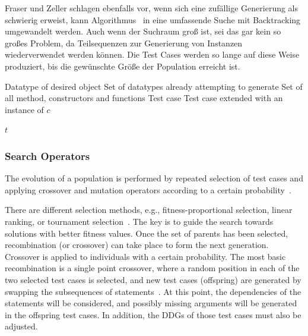 \documentclass{article}
\newcommand{\Desc}[2]{\State \makebox[2em][l]{#1}#2}
\begin{document}
Fraser und Zeller schlagen ebenfalls vor, wenn sich eine zufällige Generierung als schwierig erweist, kann Algorithmus~ in eine umfassende Suche mit Backtracking umgewandelt werden. Auch wenn der Suchraum groß ist, sei das gar kein so großes Problem, da Teilsequenzen zur Generierung von Instanzen wiederverwendet werden können. Die Test Cases werden so lange auf diese Weise produziert, bis die gewünschte Größe der Population erreicht ist.

\begin{algorithm}[t]
\caption{$GenObject(c, G, M, t)$}\label{alg:random-generation-of-args}
\begin{algorithmic}
\Input
  \Desc{$c$}{Datatype of desired object}
  \Desc{$G$}{Set of datatypes already attempting to generate}
  \Desc{$M$}{Set of all method, constructors and functions}
  \Desc{$t$}{Test case}
\EndInput
\Output
  \Desc{$t$}{Test case extended with an instance of $c$}
\EndOutput
{}

  \EndIf
\EndFor
{}
\State \Return $t$
\end{algorithmic}
\end{algorithm}

\subsubsection{Search Operators}
The evolution of a population is performed by repeated selection of test cases and applying crossover and mutation operators according to a certain probability~\cite{Fraser2012}.

There are different selection methods, e.g., fitness-proportional selection, linear ranking, or tournament selection~\cite{McMinn_2004}. The key is to guide the search towards solutions with better fitness values. Once the set of parents has been selected, recombination (or crossover) can take place to form the next generation. Crossover is applied to individuals with a certain probability. The most basic recombination is a single point crossover, where a random position in each of the two selected test cases is selected, and new test cases (offspring) are generated by swapping the subsequences of statements~\cite{Fraser2012}. At this point, the dependencies of the statements will be considered, and possibly missing arguments will be generated in the offspring test cases. In addition, the \acp{DDG} of those test cases must also be adjusted.
\end{document}
